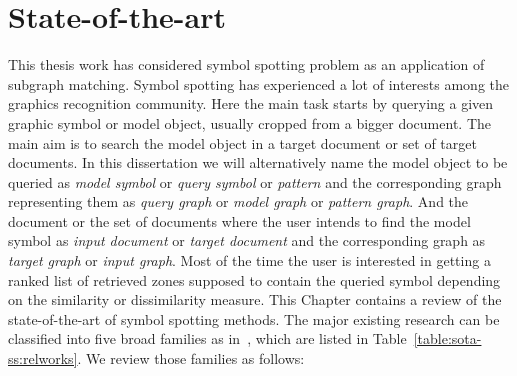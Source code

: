 \chapter{State-of-the-art} %
\label{chap:sota-ss}
\graphicspath{{./chapters/3-state-of-the-art/figs/}}

This thesis work has considered symbol spotting problem as an application of subgraph matching. Symbol spotting has experienced a lot of interests among the graphics recognition community. Here the main task starts by querying a given graphic symbol or model object, usually cropped from a bigger document. The main aim is to search the model object in a target document or set of target documents. In this dissertation we will alternatively name the model object to be queried as \emph{model symbol} or \emph{query symbol} or \emph{pattern} and the corresponding graph representing them as \emph{query graph} or \emph{model graph} or \emph{pattern graph}. And the document or the set of documents where the user intends to find the model symbol as \emph{input document} or \emph{target document} and the corresponding graph as \emph{target graph} or \emph{input graph}. Most of the time the user is interested in getting a ranked list of retrieved zones supposed to contain the queried symbol depending on the similarity or dissimilarity measure. This Chapter contains a review of the state-of-the-art of symbol spotting methods. The major existing research can be classified into five broad families as in~\cite{RusinolThesis2009}, which are listed in Table~\ref{table:sota-ss:relworks}. We review those families as follows:

